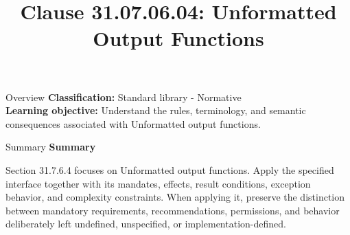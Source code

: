 \documentclass[10pt,letterpaper]{article}
\title{Clause 31.07.06.04: Unformatted Output Functions}
\author{}
\date{}
\begin{document}
\maketitle
\begin{CornellOverviewBox}{Overview}
\textbf{Classification:} Standard library - Normative\\[2pt]
\textbf{Learning objective:} Understand the rules, terminology, and semantic consequences associated with Unformatted output functions.
\end{CornellOverviewBox}\begin{CornellSummaryBox}{Summary}
{\sffamily\bfseries\color{Accent} Summary}\par\vspace{3pt}Section 31.7.6.4 focuses on Unformatted output functions. Apply the specified interface together with its mandates, effects, result conditions, exception behavior, and complexity constraints. When applying it, preserve the distinction between mandatory requirements, recommendations, permissions, and behavior deliberately left undefined, unspecified, or implementation-defined.
\end{CornellSummaryBox}
\end{document}
